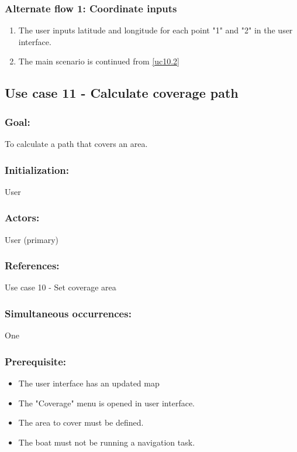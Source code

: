 \begin{framed}
	\subsubsection*{Alternate flow 1: Coordinate inputs}
	\begin{enumerate}
		\item The user inputs latitude and longitude for each point "1" and "2" in the user interface.
		\item The main scenario is continued from \ref{uc10.2}
	\end{enumerate}
\end{framed}	

\begin{framed}
	\subsection{Use case 11 - Calculate coverage path}
	\subsubsection*{Goal:}
	To calculate a path that covers an area.
	
	\subsubsection*{Initialization:}
	User
	
	\subsubsection*{Actors:}
	User (primary)
	
	\subsubsection*{References:}
	Use case 10 - Set coverage area
	
	\subsubsection*{Simultaneous occurrences:}
	One 
	
	\subsubsection*{Prerequisite:}
	\begin{itemize}
		\item The user interface has an updated map
		\item The "Coverage" menu is opened in user interface.
		\item The area to cover must be defined.
		\item The boat must not be running a navigation task.
	\end{itemize}
	

\end{framed}
